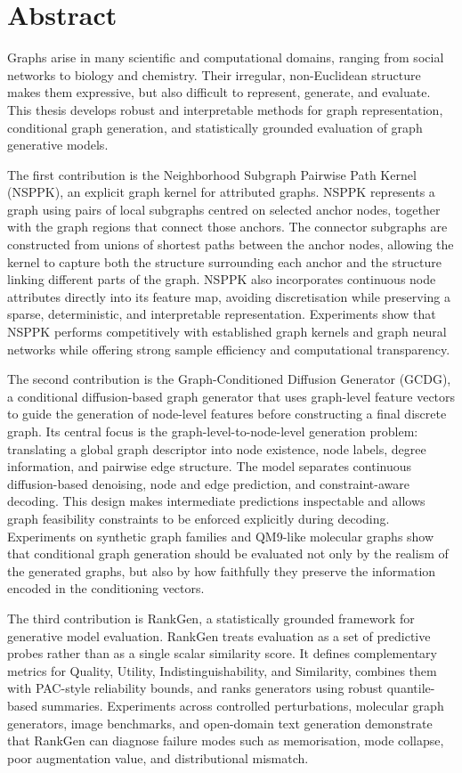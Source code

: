 \chapter*{Abstract}

Graphs arise in many scientific and computational domains, ranging from social networks to biology and chemistry. Their
irregular, non-Euclidean structure makes them expressive, but also difficult to
represent, generate, and evaluate. This thesis develops robust and
interpretable methods for graph representation, conditional graph generation,
and statistically grounded evaluation of graph generative models.

The first contribution is the Neighborhood Subgraph Pairwise Path Kernel
(NSP\-PK), an explicit graph kernel for attributed graphs. NSPPK represents a
graph using pairs of local subgraphs centred on selected anchor nodes, together
with the graph regions that connect those anchors. The connector subgraphs are
constructed from unions of shortest paths between the anchor nodes, allowing
the kernel to capture both the structure surrounding each anchor and the
structure linking different parts of the graph. NSPPK also incorporates
continuous node attributes directly into its feature map, avoiding
discretisation while preserving a sparse, deterministic, and interpretable
representation. Experiments show that NSPPK performs competitively with
established graph kernels and graph neural networks while offering strong
sample efficiency and computational transparency.

The second contribution is the Graph-Conditioned Diffusion Generator (GCD\-G), a
conditional diffusion-based graph generator that uses graph-level feature
vectors to guide the generation of node-level features before constructing a
final discrete graph. Its central focus is the graph-level-to-node-level
generation problem: translating a global graph descriptor into node existence,
node labels, degree information, and pairwise edge structure. The model
separates continuous diffusion-based denoising, node and edge prediction, and
constraint-aware decoding. This design makes intermediate predictions
inspectable and allows graph feasibility constraints to be enforced explicitly
during decoding. Experiments on synthetic graph families and QM9-like molecular
graphs show that conditional graph generation should be evaluated not only by
the realism of the generated graphs, but also by how faithfully they preserve
the information encoded in the conditioning vectors.

The third contribution is RankGen, a statistically grounded framework for
generative model evaluation. RankGen treats evaluation as a set of predictive
probes rather than as a single scalar similarity score. It defines
complementary metrics for Quality, Utility, Indistinguishability, and
Similarity, combines them with PAC-style reliability bounds, and ranks
generators using robust quantile-based summaries. Experiments across
controlled perturbations, molecular graph generators, image benchmarks, and
open-domain text generation demonstrate that RankGen can diagnose failure
modes such as memorisation, mode collapse, poor augmentation value, and
distributional mismatch.

